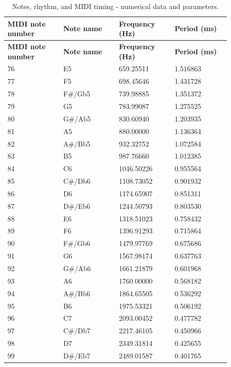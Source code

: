 \documentclass[11pt,a4paper]{article}
\begin{document}
\begingroup\small\setlength{\tabcolsep}{3pt}\renewcommand{\arraystretch}{1.18}\begin{longtable}{@{}p{0.2200\linewidth}p{0.2200\linewidth}p{0.2200\linewidth}p{0.2200\linewidth}@{}}
\caption{Notes, rhythm, and MIDI timing - numerical data and parameters.}\label{tab:010_p005_table10}\\\toprule
\textbf{MIDI note number} & \textbf{Note name} & \textbf{Frequency (Hz)} & \textbf{Period (ms)} \\ \midrule\endfirsthead \textbf{MIDI note number} & \textbf{Note name} & \textbf{Frequency (Hz)} & \textbf{Period (ms)} \\ \midrule\endhead
76 & E5 & 659.25511 & 1.516863 \\
77 & F5 & 698.45646 & 1.431728 \\
78 & F\#/\allowbreak{}Gb5 & 739.98885 & 1.351372 \\
79 & G5 & 783.99087 & 1.275525 \\
80 & G\#/\allowbreak{}Ab5 & 830.60940 & 1.203935 \\
81 & A5 & 880.00000 & 1.136364 \\
82 & A\#/\allowbreak{}Bb5 & 932.32752 & 1.072584 \\
83 & B5 & 987.76660 & 1.012385 \\
84 & C6 & 1046.50226 & 0.955564 \\
85 & C\#/\allowbreak{}Db6 & 1108.73052 & 0.901932 \\
86 & D6 & 1174.65907 & 0.851311 \\
87 & D\#/\allowbreak{}Eb6 & 1244.50793 & 0.803530 \\
88 & E6 & 1318.51023 & 0.758432 \\
89 & F6 & 1396.91293 & 0.715864 \\
90 & F\#/\allowbreak{}Gb6 & 1479.97769 & 0.675686 \\
91 & G6 & 1567.98174 & 0.637763 \\
92 & G\#/\allowbreak{}Ab6 & 1661.21879 & 0.601968 \\
93 & A6 & 1760.00000 & 0.568182 \\
94 & A\#/\allowbreak{}Bb6 & 1864.65505 & 0.536292 \\
95 & B6 & 1975.53321 & 0.506192 \\
96 & C7 & 2093.00452 & 0.477782 \\
97 & C\#/\allowbreak{}Db7 & 2217.46105 & 0.450966 \\
98 & D7 & 2349.31814 & 0.425655 \\
99 & D\#/\allowbreak{}Eb7 & 2489.01587 & 0.401765 \\

\end{longtable}
\end{document}
